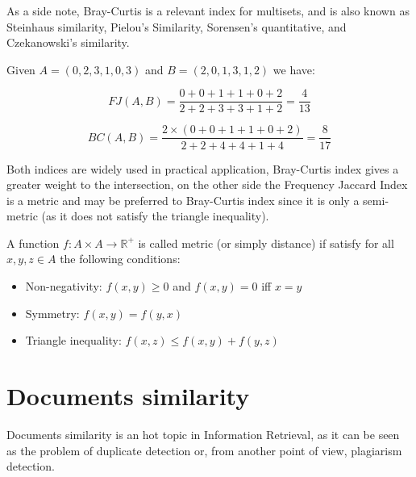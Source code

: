 As a side note, Bray-Curtis is a relevant index for multisets, and is also known as Steinhaus similarity, Pielou's Similarity, Sorensen's quantitative, and Czekanowski's similarity.

\begin{esempio}
	Given $A = (0, 2, 3, 1, 0, 3) $ and $B = (2, 0, 1, 3, 1, 2)$ we have:
	
	\begin{equation}
	FJ(A,B) = \frac{0 + 0 + 1 + 1 + 0 + 2}{2 + 2 + 3 + 3 + 1 + 2} = \frac{4}{13} 
	\end{equation}
	
	\begin{equation}
	BC(A,B) = \frac{2 \times (0 + 0 + 1 + 1 + 0 + 2) }{2 + 2 + 4 + 4 + 1 + 4} = \frac{8}{17}
	\end{equation}
\end{esempio}

Both indices are widely used in practical application, Bray-Curtis index gives a greater weight to the intersection, on the other side the Frequency Jaccard Index is a metric and may be preferred to Bray-Curtis index since it is only a semi-metric (as it does not satisfy the triangle inequality). 

\begin{definizione}
	A function $f : A \times A \rightarrow \mathbb{R}^{+} $ is called metric (or simply distance) if satisfy for all $x, y, z \in A$ the following conditions:
	\begin{itemize}
		\item Non-negativity: $f(x,y) \geq 0$ and $f(x,y) = 0$ iff $x = y$
		\item Symmetry: $f(x, y) = f(y, x)$
		\item Triangle inequality: $f(x, z) \leq f(x, y) + f(y, z)$
	\end{itemize}
\end{definizione}

\section{Documents similarity}

Documents similarity is an hot topic in Information Retrieval, as it can be seen as the problem of duplicate detection or, from another point of view, plagiarism detection.\\

